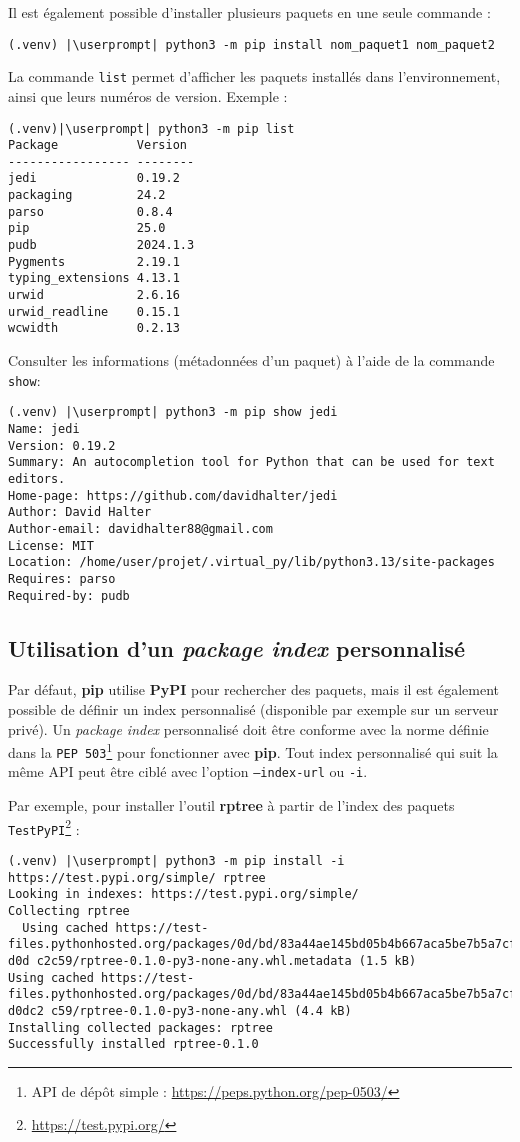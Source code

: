 Il est également possible d'installer plusieurs paquets en une seule commande :
\begin{lstlisting}[style=bash]
(.venv) |\userprompt| python3 -m pip install nom_paquet1 nom_paquet2
\end{lstlisting}

La commande \texttt{list} permet d'afficher les paquets installés dans l'environnement, ainsi que leurs numéros de version. Exemple :
\begin{lstlisting}[style=bash]
(.venv)|\userprompt| python3 -m pip list
Package           Version
----------------- --------
jedi              0.19.2
packaging         24.2
parso             0.8.4
pip               25.0
pudb              2024.1.3
Pygments          2.19.1
typing_extensions 4.13.1
urwid             2.6.16
urwid_readline    0.15.1
wcwidth           0.2.13
\end{lstlisting}

Consulter les informations (métadonnées d'un paquet) à l'aide de la commande \texttt{show}:
\begin{lstlisting}[style=bash]
(.venv) |\userprompt| python3 -m pip show jedi
Name: jedi
Version: 0.19.2
Summary: An autocompletion tool for Python that can be used for text editors.
Home-page: https://github.com/davidhalter/jedi
Author: David Halter
Author-email: davidhalter88@gmail.com
License: MIT
Location: /home/user/projet/.virtual_py/lib/python3.13/site-packages
Requires: parso
Required-by: pudb
\end{lstlisting}

\subsection*{Utilisation d’un \textit{package index} personnalisé}
Par défaut, \textbf{pip} utilise \textbf{PyPI} pour rechercher des paquets, mais il est également possible de définir un index personnalisé (disponible par exemple sur un serveur privé). Un \textit{package index} personnalisé doit être conforme avec la norme définie dans la \texttt{PEP 503}\footnote{API de dépôt simple : \url{https://peps.python.org/pep-0503/}} pour fonctionner avec \textbf{pip}. Tout index personnalisé qui suit la même API peut être ciblé avec l’option \texttt{--index-url} ou \texttt{-i}.

Par exemple, pour installer l’outil \textbf{rptree} à partir de l’index des paquets \texttt{TestPyPI}\footnote{\url{https://test.pypi.org/}} :
\begin{lstlisting}[style=bash]
(.venv) |\userprompt| python3 -m pip install -i https://test.pypi.org/simple/ rptree
Looking in indexes: https://test.pypi.org/simple/
Collecting rptree
  Using cached https://test-files.pythonhosted.org/packages/0d/bd/83a44ae145bd05b4b667aca5be7b5a7cf61d0d26577c0c93f2a2 d0d c2c59/rptree-0.1.0-py3-none-any.whl.metadata (1.5 kB)
Using cached https://test-files.pythonhosted.org/packages/0d/bd/83a44ae145bd05b4b667aca5be7b5a7cf61d0d26577c0c93f2a2 d0dc2 c59/rptree-0.1.0-py3-none-any.whl (4.4 kB)
Installing collected packages: rptree
Successfully installed rptree-0.1.0
\end{lstlisting}

